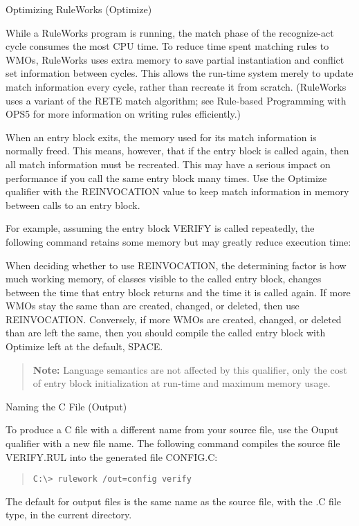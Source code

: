 
Optimizing RuleWorks (Optimize)

While a RuleWorks program is running, the match phase of
the recognize-act cycle consumes the most CPU time. To
reduce time spent matching rules to WMOs, RuleWorks uses
extra memory to save partial instantiation and conflict
set information between cycles. This allows the run-time
system merely to update match information every cycle,
rather than recreate it from scratch. (RuleWorks uses a
variant of the RETE match algorithm; see Rule-based
Programming with OPS5 for more information on writing
rules efficiently.)

When an entry block exits, the memory used for its match
information is normally freed. This means, however, that
if the entry block is called again, then all match
information must be recreated. This may have a serious
impact on performance if you call the same entry block
many times. Use the Optimize qualifier with the
REINVOCATION value to keep match information in memory
between calls to an entry block.

For example, assuming the entry block VERIFY is called
repeatedly, the following command retains some memory but
may greatly reduce execution time:


When deciding whether to use REINVOCATION, the
determining factor is how much working memory, of classes
visible to the called entry block, changes between the
time that entry block returns and the time it is called
again. If more WMOs stay the same than are created,
changed, or deleted, then use REINVOCATION. Conversely,
if more WMOs are created, changed, or deleted than are
left the same, then you should compile the called entry
block with Optimize left at the default, SPACE.

\begin{quote}
  \textbf{Note:} Language semantics are not affected by this
  qualifier, only the cost of entry block initialization at run-time
  and maximum memory usage.
\end{quote}

Naming the C File (Output)

To produce a C file with a different name from your
source file, use the Ouput qualifier with a new file
name. The following command compiles the source file
VERIFY.RUL into the generated file CONFIG.C:
\begin{quote}
\begin{verbatim}
C:\> rulework /out=config verify
\end{verbatim}
\end{quote}  
The default for output files is the same name as the
source file, with the .C file type, in the current
directory.

